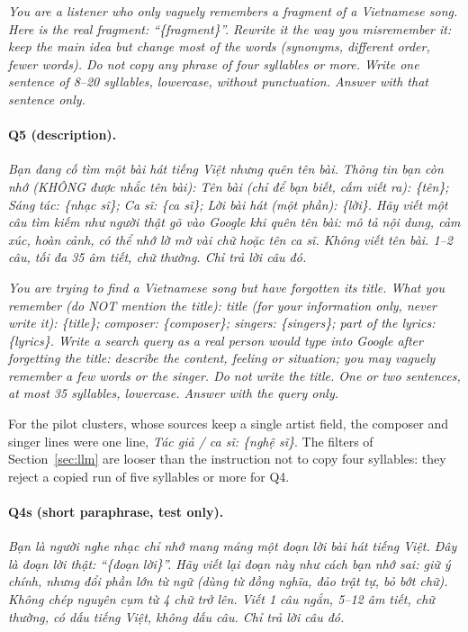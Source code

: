 \documentclass[11pt]{article}
\newcommand{\vi}[1]{\textit{#1}}          %
\newcommand{\Qfour}{Q4\xspace}
\newcommand{\Qfive}{Q5\xspace}
\begin{document}
\noindent\emph{You are a listener who only vaguely remembers a fragment of a Vietnamese song. Here is the
real fragment: ``\{fragment\}''. Rewrite it the way you misremember it: keep the main idea but change most
of the words (synonyms, different order, fewer words). Do not copy any phrase of four syllables or more.
Write one sentence of 8--20 syllables, lowercase, without punctuation. Answer with that sentence only.}

\paragraph{\Qfive{} (description).}
\vi{Bạn đang cố tìm một bài hát tiếng Việt nhưng quên tên bài. Thông tin bạn còn nhớ (KHÔNG được nhắc tên
bài): Tên bài (chỉ để bạn biết, cấm viết ra): \{tên\}; Sáng tác: \{nhạc sĩ\}; Ca sĩ: \{ca sĩ\}; Lời bài hát
(một phần): \{lời\}. Hãy viết một câu tìm kiếm như người thật gõ vào Google khi quên tên bài: mô tả nội
dung, cảm xúc, hoàn cảnh, có thể nhớ lờ mờ vài chữ hoặc tên ca sĩ. Không viết tên bài. 1--2 câu, tối đa 35
âm tiết, chữ thường. Chỉ trả lời câu đó.}

\noindent\emph{You are trying to find a Vietnamese song but have forgotten its title. What you remember (do
NOT mention the title): title (for your information only, never write it): \{title\}; composer:
\{composer\}; singers: \{singers\}; part of the lyrics: \{lyrics\}. Write a search query as a real person
would type into Google after forgetting the title: describe the content, feeling or situation; you may
vaguely remember a few words or the singer. Do not write the title. One or two sentences, at most 35
syllables, lowercase. Answer with the query only.}

\noindent For the pilot clusters, whose sources keep a single artist field, the composer and singer lines
were one line, \vi{Tác giả / ca sĩ: \{nghệ sĩ\}}. The filters of Section~\ref{sec:llm} are looser than the
instruction not to copy four syllables: they reject a copied run of five syllables or more for \Qfour.

\paragraph{Q4s (short paraphrase, test only).}
\vi{Bạn là người nghe nhạc chỉ nhớ mang máng một đoạn lời bài hát tiếng Việt. Đây là đoạn lời thật:
``\{đoạn lời\}''. Hãy viết lại đoạn này như cách bạn nhớ sai: giữ ý chính, nhưng đổi phần lớn từ ngữ (dùng
từ đồng nghĩa, đảo trật tự, bỏ bớt chữ). Không chép nguyên cụm từ 4 chữ trở lên. Viết 1 câu ngắn, 5--12 âm
tiết, chữ thường, có dấu tiếng Việt, không dấu câu. Chỉ trả lời câu đó.}
\end{document}
